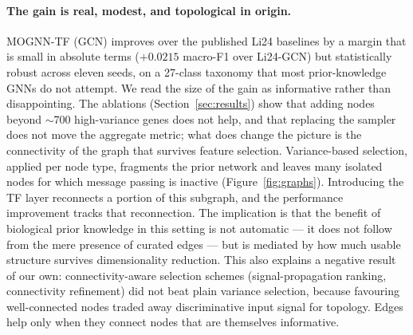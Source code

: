 \documentclass[review,3p,times,11pt, ]{elsarticle} %
\begin{document}
\paragraph{The gain is real, modest, and topological in origin.}
MOGNN-TF (GCN) improves over the published Li24 baselines by a margin
that is small in absolute terms ($+0.0215$ macro-F1 over Li24-GCN) but
statistically robust across eleven seeds, on a 27-class taxonomy that
most prior-knowledge GNNs do not attempt. We read the size of the gain
as informative rather than disappointing. The ablations
(Section~\ref{sec:results}) show that adding nodes beyond $\sim$700
high-variance genes does not help, and that replacing the sampler does
not move the aggregate metric; what does change the picture is the
connectivity of the graph that survives feature selection. Variance-based
selection, applied per node type, fragments the prior network and leaves
many isolated nodes for which message passing is inactive
(Figure~\ref{fig:graphs}). Introducing the TF layer reconnects a portion
of this subgraph, and the performance improvement tracks that
reconnection. The implication is that the benefit of biological prior
knowledge in this setting is not automatic — it does not follow from the
mere presence of curated edges — but is mediated by how much usable
structure survives dimensionality reduction. This also explains a
negative result of our own: connectivity-aware selection schemes
(signal-propagation ranking, connectivity refinement) did not beat plain
variance selection, because favouring well-connected nodes traded away
discriminative input signal for topology. Edges help only when they
connect nodes that are themselves informative.

\end{document}
